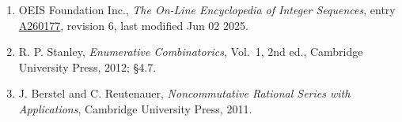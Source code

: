\documentclass[11pt]{article}
\theoremstyle{definition}
\begin{document}
\begin{enumerate}

\item OEIS Foundation Inc., \emph{The On-Line Encyclopedia of Integer Sequences}, entry \href{https://oeis.org/A260177}{A260177}, revision 6, last modified Jun 02 2025.

\item R. P. Stanley, \emph{Enumerative Combinatorics}, Vol.~1, 2nd ed., Cambridge University Press, 2012; \S4.7.

\item J. Berstel and C. Reutenauer, \emph{Noncommutative Rational Series with Applications}, Cambridge University Press, 2011.

\end{enumerate}
\end{document}
